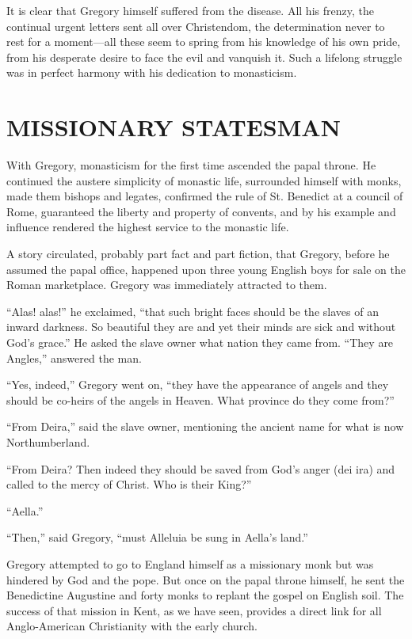 It is clear that Gregory himself suffered from the disease. All his frenzy, the continual urgent
letters sent all over Christendom, the determination never to rest for a moment—all these seem to
spring from his knowledge of his own pride, from his desperate desire to face the evil and vanquish
it. Such a lifelong struggle was in perfect harmony with his dedication to monasticism.

\section{MISSIONARY STATESMAN}

With Gregory, monasticism for the first time ascended the papal throne. He continued the austere
simplicity of monastic life, surrounded himself with monks, made them bishops and legates, confirmed
the rule of St. Benedict at a council of Rome, guaranteed the liberty and property of convents, and
by his example and influence rendered the highest service to the monastic life.

A story circulated, probably part fact and part fiction, that Gregory, before he assumed the papal
office, happened upon three young English boys for sale on the Roman marketplace. Gregory was
immediately attracted to them.

“Alas! alas!” he exclaimed, “that such bright faces should be the slaves of an inward darkness. So
beautiful they are and yet their minds are sick and without God’s grace.” He asked the slave owner
what nation they came from. “They are Angles,” answered the man.

“Yes, indeed,” Gregory went on, “they have the appearance of angels and they should be co-heirs of
the angels in Heaven. What province do they come from?”

“From Deira,” said the slave owner, mentioning the ancient name for what is now Northumberland.

“From Deira? Then indeed they should be saved from God’s anger (dei ira) and called to the mercy of
Christ. Who is their King?”

“Aella.”

“Then,” said Gregory, “must Alleluia be sung in Aella’s land.”

Gregory attempted to go to England himself as a missionary monk but was hindered by God and the
pope. But once on the papal throne himself, he sent the Benedictine Augustine and forty monks to
replant the gospel on English soil. The success of that mission in Kent, as we have seen, provides a
direct link for all Anglo-American Christianity with the early church.

